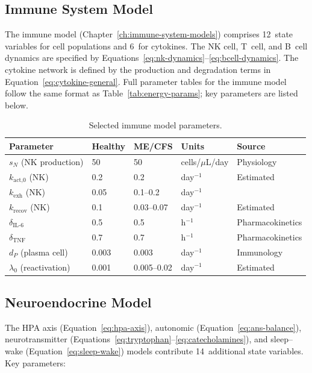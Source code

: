 \subsection{Immune System Model}

The immune model (Chapter~\ref{ch:immune-system-models}) comprises 12~state variables for cell populations and 6~for cytokines. The NK cell, T~cell, and B~cell dynamics are specified by Equations~\ref{eq:nk-dynamics}--\ref{eq:bcell-dynamics}. The cytokine network is defined by the production and degradation terms in Equation~\ref{eq:cytokine-general}. Full parameter tables for the immune model follow the same format as Table~\ref{tab:energy-params}; key parameters are listed below.

\begin{table}[htbp]
\centering
\caption{Selected immune model parameters.}
\label{tab:immune-params}
\small
\begin{tabular}{llllp{3.5cm}}
\hline
\textbf{Parameter} & \textbf{Healthy} & \textbf{ME/CFS} & \textbf{Units} & \textbf{Source} \\
\hline
$s_N$ (NK production) & 50 & 50 & cells/$\mu$L/day & Physiology \\
$k_{\text{act,0}}$ (NK) & 0.2 & 0.2 & day$^{-1}$ & Estimated \\
$k_{\text{exh}}$ (NK) & 0.05 & 0.1--0.2 & day$^{-1}$ & \cite{Hardcastle2016} \\
$k_{\text{recov}}$ (NK) & 0.1 & 0.03--0.07 & day$^{-1}$ & Estimated \\
$\delta_{\text{IL-6}}$ & 0.5 & 0.5 & h$^{-1}$ & Pharmacokinetics \\
$\delta_{\text{TNF}}$ & 0.7 & 0.7 & h$^{-1}$ & Pharmacokinetics \\
$d_P$ (plasma cell) & 0.003 & 0.003 & day$^{-1}$ & Immunology \\
$\lambda_0$ (reactivation) & 0.001 & 0.005--0.02 & day$^{-1}$ & Estimated \\
\hline
\end{tabular}
\end{table}

\subsection{Neuroendocrine Model}

The HPA axis (Equation~\ref{eq:hpa-axis}), autonomic (Equation~\ref{eq:ans-balance}), neurotransmitter (Equations~\ref{eq:tryptophan}--\ref{eq:catecholamines}), and sleep--wake (Equation~\ref{eq:sleep-wake}) models contribute 14~additional state variables. Key parameters:

